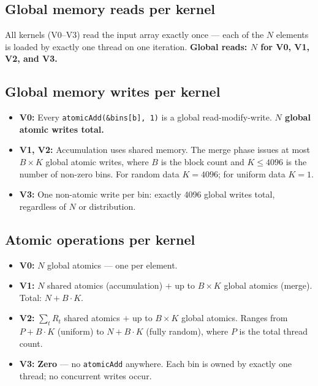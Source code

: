 \documentclass[11pt, letterpaper]{article}
\begin{document}
\subsection*{Global memory reads per kernel}

All kernels (V0--V3) read the input array exactly once — each of the $N$
elements is loaded by exactly one thread on one iteration.
\textbf{Global reads: $N$ for V0, V1, V2, and V3.}

\subsection*{Global memory writes per kernel}

\begin{itemize}[noitemsep]
  \item \textbf{V0:} Every \texttt{atomicAdd(\&bins[b],\,1)} is a global
        read-modify-write.  \textbf{$N$ global atomic writes total.}
  \item \textbf{V1, V2:} Accumulation uses shared memory.  The merge phase
        issues at most $B \times K$ global atomic writes, where $B$ is
        the block count and $K \leq 4096$ is the number of non-zero bins.
        For random data $K = 4096$; for uniform data $K = 1$.
  \item \textbf{V3:} One non-atomic write per bin: exactly 4096 global
        writes total, regardless of $N$ or distribution.
\end{itemize}

\subsection*{Atomic operations per kernel}

\begin{itemize}[noitemsep]
  \item \textbf{V0:} $N$ global atomics — one per element.
  \item \textbf{V1:} $N$ shared atomics (accumulation) $+$ up to
        $B \times K$ global atomics (merge).
        Total: $N + B \cdot K$.
  \item \textbf{V2:} $\sum_t R_t$ shared atomics $+$ up to $B \times K$
        global atomics.  Ranges from $P + B \cdot K$ (uniform) to
        $N + B \cdot K$ (fully random), where $P$ is the total thread count.
  \item \textbf{V3:} \textbf{Zero} — no \texttt{atomicAdd} anywhere.
        Each bin is owned by exactly one thread; no concurrent writes occur.
\end{itemize}
\end{document}
